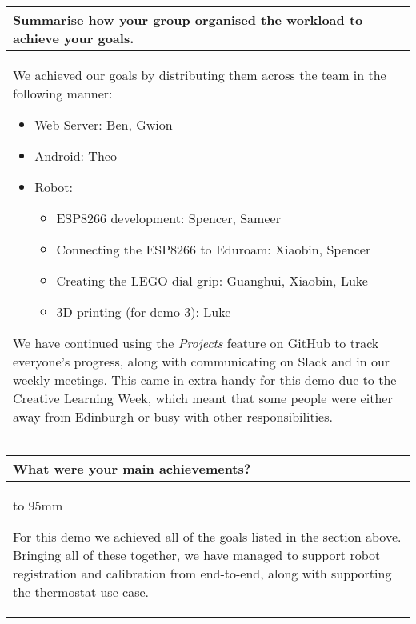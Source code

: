 \documentclass[a4paper]{article}
\newcommand{\colWidth}{141mm}
\begin{document}
\begin{center}
\begin{tabular}{|p{\colWidth}|}
	\hline
\end{tabular}
\vskip 5mm


\begin{tabular}{|p{\colWidth}|}
	\hline
	\cellcolor{blue!25}\large
	\textbf{Summarise how your group organised the workload to achieve your goals.}
	\\ \hline
	
		We achieved our goals by distributing them across the team in the following manner:
		\begin{itemize}
			\item Web Server: Ben, Gwion
			\item Android: Theo
			\item Robot:
			\begin{itemize}
				\item ESP8266 development: Spencer, Sameer
				\item Connecting the ESP8266 to Eduroam: Xiaobin, Spencer
				\item Creating the LEGO dial grip: Guanghui, Xiaobin, Luke
				\item 3D-printing (for demo 3): Luke
			\end{itemize}
		\end{itemize}

		We have continued using the \textit{Projects} feature on GitHub to track everyone's progress, along with communicating on Slack and in our weekly meetings.
		This came in extra handy for this demo due to the Creative Learning Week, which meant that some people were either away from Edinburgh or busy with other responsibilities.
	
  \\
  \hline
\end{tabular}
\vskip 5mm


\begin{tabular}{|p{\colWidth}|}
	\hline
	\cellcolor{blue!25}\large
	\textbf{What were your main achievements?}
	\\ \hline
	\vtop to 95mm{
		For this demo we achieved all of the goals listed in the section above. Bringing all of these together, we have
		managed to support robot registration and calibration from end-to-end, along with supporting the thermostat use case.

		\vspace{2mm}

}
\end{tabular}
\end{center}
\end{document}

